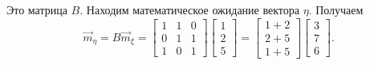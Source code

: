 \begin{enumerate}[label=\alph*)]
  Это матрица $B$.
  Находим математическое ожидание вектора $ \eta $.
  Получаем
  $$ \vec{m}_{ \eta } =
    B \vec{m}_{ \xi } =
    \begin{bmatrix}
      1 & 1 & 0 \\
      0 & 1 & 1 \\
      1 & 0 & 1
    \end{bmatrix}
    \begin{bmatrix}
      1 \\
      2 \\
      5
    \end{bmatrix} =
    \begin{bmatrix}
      1 + 2 \\
      2 + 5 \\
      1 + 5
    \end{bmatrix}
    \begin{bmatrix}
      3 \\
      7 \\
      6
    \end{bmatrix}.$$


\end{enumerate}
